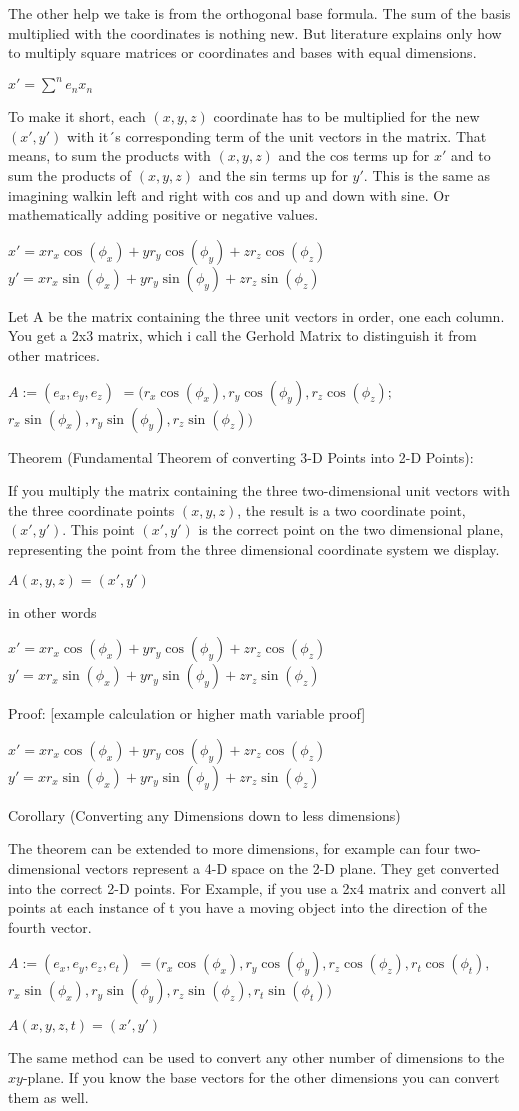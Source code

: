 \documentclass{letter}
\begin{document}
The other help we take is from the orthogonal base formula.
The sum of the basis multiplied with the coordinates is nothing
new. But literature explains only how to multiply square matrices
or coordinates and bases with equal dimensions.

$x' = \displaystyle\sum^{n} e_nx_n$

To make it short, each $(x,y,z)$ coordinate has to be multiplied for the new $(x',y')$
with it´s corresponding term of the unit vectors in the matrix. That means,
to sum the products with $(x,y,z)$ and the cos terms up for $x'$ and to sum the products
of $(x,y,z)$ and the sin terms up for $y'$. This is the same as imagining walkin left and
right with cos and up and down with sine. Or mathematically adding positive or negative values.


$x' = xr_x\cos(\phi_x) + yr_y\cos(\phi_y) + zr_z\cos(\phi_z)$
$y' = xr_x\sin(\phi_x) + yr_y\sin(\phi_y) + zr_z\sin(\phi_z)$


Let A be the matrix containing the three unit vectors in order, one each
column. You get a 2x3 matrix, which i call the Gerhold Matrix to distinguish 
it from other matrices.

$A := (e_x, e_y, e_z)$
$  = (r_x\cos(\phi_x), r_y\cos(\phi_y), r_z\cos(\phi_z);$
$     r_x\sin(\phi_x), r_y\sin(\phi_y), r_z\sin(\phi_z))$


Theorem (Fundamental Theorem of converting 3-D Points into 2-D Points):


If you multiply the matrix containing the three two-dimensional unit vectors
with the three coordinate points $(x,y,z)$, the result is a two coordinate point, 
$(x',y')$. This point $(x',y')$ is the correct point on the two dimensional plane,
representing the point from the three dimensional coordinate system we display.


$A(x,y,z) = (x',y')$

in other words

$x' = xr_x\cos(\phi_x) + yr_y\cos(\phi_y) + zr_z\cos(\phi_z)$
$y' = xr_x\sin(\phi_x) + yr_y\sin(\phi_y) + zr_z\sin(\phi_z)$

Proof:
[example calculation or higher math variable proof]

$x' = xr_x\cos(\phi_x) + yr_y\cos(\phi_y) + zr_z\cos(\phi_z)$
$y' = xr_x\sin(\phi_x) + yr_y\sin(\phi_y) + zr_z\sin(\phi_z)$

Corollary (Converting any Dimensions down to less dimensions)

The theorem can be extended to more dimensions, for example can four two-dimensional
vectors represent a 4-D space on the 2-D plane. They get converted into the correct
2-D points. For Example, if you use a 2x4 matrix and convert all points at each 
instance of t you have a moving object into the direction of the fourth vector. 

$A := (e_x, e_y, e_z, e_t)$
$  = (r_x\cos(\phi_x), r_y\cos(\phi_y), r_z\cos(\phi_z), r_t\cos(\phi_t),$
$     r_x\sin(\phi_x), r_y\sin(\phi_y), r_z\sin(\phi_z), r_t\sin(\phi_t))$

$A(x,y,z,t)=(x',y')$

The same method can be used to convert any other number of dimensions to the $xy$-plane.
If you know the base vectors for the other dimensions you can convert them as well.
\end{document}
